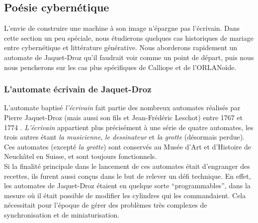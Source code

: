 \documentclass{article}
\begin{document}
		\subsection{Poésie cybernétique}
			L'envie de construire une machine à son image n'épargne pas l'écrivain. Dans cette section un peu spéciale, nous étudierons quelques cas historiques de mariage entre cybernétique et littérature générative. Nous aborderons rapidement un automate de Jaquet-Droz qu'il faudrait voir comme un point de départ, puis nous nous pencherons sur les cas plus spécifiques de Calliope et de l'ORLANoïde.
			
			\subsubsection{L'automate écrivain de Jaquet-Droz}
				L'automate baptisé \textit{l'écrivain} fait partie des nombreux automates réalisés par Pierre Jaquet-Droz (mais aussi son fils et Jean-Frédéric Leschot) entre 1767 et 1774 \cite{wiki:jaquet_droz}. \textit{L'écrivain} appartient plus précisément à une série de quatre automates, les trois autres étant \textit{la musicienne}, \textit{le dessinateur} et \textit{la grotte} (désormais perdue). Ces automates (excepté \textit{la grotte}) sont conservés au Musée d'Art et d'Histoire de Neuchâtel en Suisse, et sont toujours fonctionnels.\\
				
				Si la finalité principale dans le lancement de ces automates était d'engranger des recettes, ils furent aussi conçus dans le but de relever un défi technique. En effet, les automates de Jaquet-Droz étaient en quelque sorte ``programmables'', dans la mesure où il était possible de modifier les cylindres qui les commandaient. Cela nécessitait pour l'époque de gérer des problèmes très complexes de synchronisation et de miniaturisation.\\
				
\end{document}
